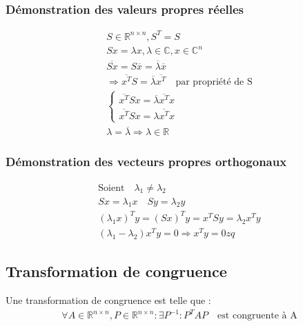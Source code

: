\documentclass[a4paper]{book}
\begin{document}
\subsubsection{Démonstration des valeurs propres réelles}
\begin{gather*}
    S \in \mathbb{R}^{n\times n}, S^T = S \\
    Sx = \lambda x, \lambda \in \mathbb{C}, x \in \mathbb{C}^n \\
    \overline{Sx} = S\overline{x} = \overline{\lambda}\overline{x}\\
    \Rightarrow \overline{x^T}S = \overline{\lambda}\overline{x^T} \quad \text{par propriété de S} \\
    \begin{cases} \overline{x^T}Sx = \overline{\lambda}\overline{x^T}x \\
    \overline{x^T}Sx = \lambda \overline{x^T}x
    \end{cases} \\
    \lambda = \overline{\lambda} \Rightarrow \lambda \in \mathbb{R}
\end{gather*}
\subsubsection{Démonstration des vecteurs propres orthogonaux}
\begin{gather*}
    \text{Soient} \quad \lambda_1 \neq \lambda_2 \quad \\
    Sx = \lambda_1 x \quad Sy = \lambda_2 y \\
    (\lambda_1x)^Ty = (Sx)^Ty = x^TSy = \lambda_2 x^Ty \\
    (\lambda_1 - \lambda_2)x^Ty = 0 \Rightarrow x^Ty = 0zq
\end{gather*}
\subsection{Transformation de congruence}
Une transformation de congruence est telle que :
\begin{gather}
    \forall A \in \mathbb{R}^{n\times n}, P \in \mathbb{R}^{n\times n} : \exists P^{-1} : P^TAP \quad \text{est congruente à A}
\end{gather}
\end{document}
